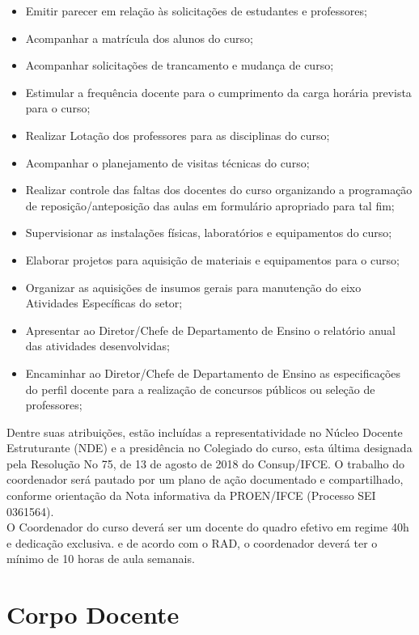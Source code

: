 \begin{itemize}
\item Emitir parecer em relação às solicitações de estudantes e professores;
\item Acompanhar a matrícula dos alunos do curso;
\item Acompanhar solicitações de trancamento e mudança de curso;
\item Estimular a frequência docente para o cumprimento da carga horária prevista para o curso;
\item Realizar Lotação dos professores para as disciplinas do curso;
\item Acompanhar o planejamento de visitas técnicas do curso;
\item Realizar controle das faltas dos docentes do curso organizando a programação de reposição/anteposição das aulas em formulário apropriado para tal fim;
\item Supervisionar as instalações físicas, laboratórios e equipamentos do curso;
\item Elaborar projetos para aquisição de materiais e equipamentos para o curso;
\item Organizar as aquisições de insumos gerais para manutenção do eixo Atividades Específicas do setor;
\item Apresentar ao Diretor/Chefe de Departamento de Ensino o relatório anual das atividades desenvolvidas;
\item Encaminhar ao Diretor/Chefe de Departamento de Ensino as especificações do perfil docente para a realização de concursos públicos ou seleção de professores;
\end{itemize}

Dentre suas atribuições, estão incluídas a representatividade no Núcleo Docente Estruturante (NDE) e a presidência no Colegiado do curso, esta última designada pela Resolução No 75, de 13 de agosto de 2018 do Consup/IFCE. O trabalho do coordenador será pautado por um plano de ação documentado e compartilhado, conforme orientação da Nota informativa da PROEN/IFCE (Processo SEI 0361564).\\

O Coordenador do curso deverá ser um docente do quadro efetivo em regime 40h e dedicação exclusiva. e de acordo com o RAD, o coordenador deverá ter o mínimo de 10 horas de aula semanais.\\

\chapter{Corpo Docente}

